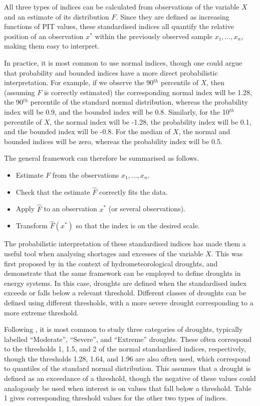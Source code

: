 All three types of indices can be calculated from observations of the variable \(X\) and an estimate of its distribution \(F\). Since they are defined as increasing functions of PIT values, these standardised indices all quantify the relative position of an observation \(x^{*}\) within the previously observed sample \(x_{1}, \dots, x_{n}\), making them easy to interpret.

In practice, it is most common to use normal indices, though one could argue that probability and bounded indices have a more direct probabilistic interpretation. For example, if we observe the 90\(^{th}\) percentile of \(X\), then (assuming \(F\) is correctly estimated) the corresponding normal index will be 1.28, the 90\(^{th}\) percentile of the standard normal distribution, whereas the probability index will be 0.9, and the bounded index will be 0.8. Similarly, for the 10\(^{th}\) percentile of \(X\), the normal index will be -1.28, the probability index will be 0.1, and the bounded index will be -0.8. For the median of \(X\), the normal and bounded indices will be zero, whereas the probability index will be 0.5.

The general framework can therefore be summarised as follows.

\begin{itemize}
\tightlist
\item
  Estimate \(F\) from the observations \(x_{1}, \dots, x_{n}\).
\item
  Check that the estimate \(\hat{F}\) correctly fits the data.
\item
  Apply \(\hat{F}\) to an observation \(x^{*}\) (or several observations).
\item
  Transform \(\hat{F}(x^{*})\) so that the index is on the desired scale.
\end{itemize}

The probabilistic interpretation of these standardised indices has made them a useful tool when analysing shortages and excesses of the variable \(X\). This was first proposed by \cite{MckeeEtAl1993} in the context of hydrometeorological droughts, and \cite{AllenOtero2023} demonstrate that the same framework can be employed to define droughts in energy systems. In this case, droughts are defined when the standardised index exceeds or falls below a relevant threshold. Different classes of droughts can be defined using different thresholds, with a more severe drought corresponding to a more extreme threshold.

Following \cite{MckeeEtAl1993}, it is most common to study three categories of droughts, typically labelled ``Moderate'', ``Severe'', and ``Extreme'' droughts. These often correspond to the thresholds 1, 1.5, and 2 of the normal standardised indices, respectively, though the thresholds 1.28, 1.64, and 1.96 are also often used, which correspond to quantiles of the standard normal distribution. This assumes that a drought is defined as an exceedance of a threshold, though the negative of these values could analogously be used when interest is on values that fall below a threshold. Table 1 gives corresponding threshold values for the other two types of indices.

